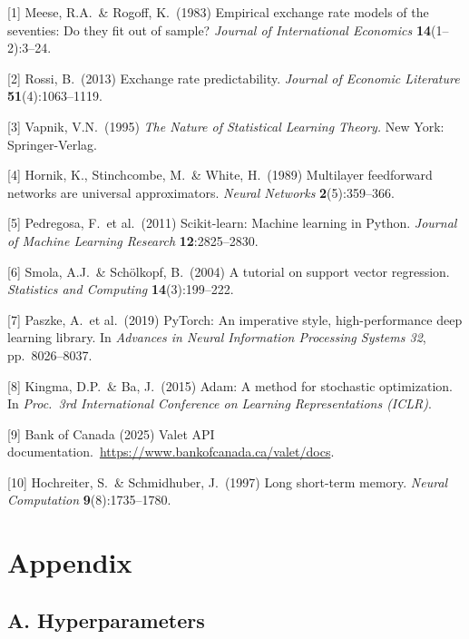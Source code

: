 \documentclass{article}
\begin{document}
\medskip
{
\small

[1] Meese, R.A.\ \& Rogoff, K.\ (1983) Empirical exchange rate models of the seventies: Do they fit out of sample? {\it Journal of International Economics} {\bf 14}(1--2):3--24.

[2] Rossi, B.\ (2013) Exchange rate predictability. {\it Journal of Economic Literature} {\bf 51}(4):1063--1119.

[3] Vapnik, V.N.\ (1995) {\it The Nature of Statistical Learning Theory.} New York: Springer-Verlag.

[4] Hornik, K., Stinchcombe, M.\ \& White, H.\ (1989) Multilayer feedforward networks are universal approximators. {\it Neural Networks} {\bf 2}(5):359--366.

[5] Pedregosa, F.\ et al.\ (2011) Scikit-learn: Machine learning in Python. {\it Journal of Machine Learning Research} {\bf 12}:2825--2830.

[6] Smola, A.J.\ \& Sch\"olkopf, B.\ (2004) A tutorial on support vector regression. {\it Statistics and Computing} {\bf 14}(3):199--222.

[7] Paszke, A.\ et al.\ (2019) PyTorch: An imperative style, high-performance deep learning library. In {\it Advances in Neural Information Processing Systems 32}, pp.\ 8026--8037.

[8] Kingma, D.P.\ \& Ba, J.\ (2015) Adam: A method for stochastic optimization. In {\it Proc.\ 3rd International Conference on Learning Representations (ICLR)}.

[9] Bank of Canada (2025) Valet API documentation.~\url{https://www.bankofcanada.ca/valet/docs}.

[10] Hochreiter, S.\ \& Schmidhuber, J.\ (1997) Long short-term memory. {\it Neural Computation} {\bf 9}(8):1735--1780.
}

\section*{Appendix}

\subsection*{A. Hyperparameters}
\end{document}
